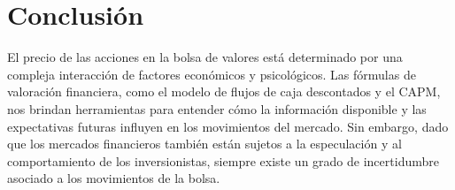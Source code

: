 \section{Conclusión}

El precio de las acciones en la bolsa de valores está determinado por una compleja interacción de factores económicos y psicológicos. Las fórmulas de valoración financiera, como el modelo de flujos de caja descontados y el CAPM, nos brindan herramientas para entender cómo la información disponible y las expectativas futuras influyen en los movimientos del mercado. Sin embargo, dado que los mercados financieros también están sujetos a la especulación y al comportamiento de los inversionistas, siempre existe un grado de incertidumbre asociado a los movimientos de la bolsa.


